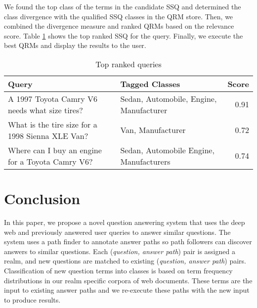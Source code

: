 We found the top class of the terms in the candidate SSQ and determined the class divergence with the qualified SSQ classes in the QRM store. Then, we combined the divergence measure and ranked QRMs based on the relevance score. Table \ref{tbl:ranked_queries} shows the top ranked SSQ for the query. Finally, we execute the best QRMs and display the results to the user.

\begin{table}[!]\footnotesize

\begin{tabular}{| p{3.5cm} | p{3cm} | r |}
	\hline
	Query & Tagged Classes & Score\\ 
	\hline
	\small A 1997 Toyota Camry V6 needs what size tires? & \small Sedan, Automobile, Engine, Manufacturer & 0.91\\ 
	\hline 
	\small What is the tire size for a 1998 Sienna XLE Van? & \small Van, Manufacturer & 0.72\\
	\hline 
	\small Where can I buy an engine for a Toyota Camry V6? & \small Sedan, Automobile Engine, Manufacturers & 0.74 \\
	\hline 
\end{tabular}

\caption{Top ranked queries}
\label{tbl:ranked_queries}   

\end{table}


\section{Conclusion}

In this paper, we propose a novel question answering system that uses the deep web and previously answered user queries to answer similar questions. The system uses a path finder to annotate answer paths so path followers can discover answers to similar questions.  Each (\emph{question, answer path}) pair is assigned a realm, and new questions are matched to existing (\emph{question, answer path}) pairs. Classification of new question terms into classes is based on term frequency distributions in our realm specific corpora of web documents.  These terms are the input to existing answer paths and we re-execute these paths with the new input to produce results.


